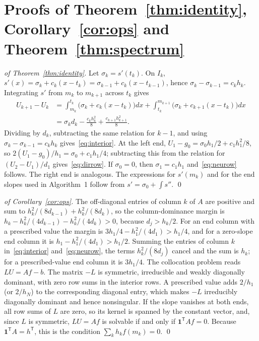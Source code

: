 
\appendix
\section{Proofs of Theorem~\ref{thm:identity}, Corollary~\ref{cor:ops} and Theorem~\ref{thm:spectrum}}\label{app:proofs}
\begin{proof}[of Theorem~\ref{thm:identity}]
Let $\sigma_k=s'(t_k)$. On $I_k$, $s'(x)=\sigma_k+c_k(x-t_k)=\sigma_{k-1}+c_k(x-t_{k-1})$, hence
$\sigma_k-\sigma_{k-1}=c_kh_k$. Integrating $s'$ from $m_k$ to $m_{k+1}$ across $t_k$ gives
\begin{align*}
U_{k+1}-U_k&=\int_{m_k}^{t_k}\!\big(\sigma_k+c_k(x-t_k)\big)dx+\int_{t_k}^{m_{k+1}}\!\big(\sigma_k+c_{k+1}(x-t_k)\big)dx\\
&=\sigma_kd_k-\frac{c_kh_k^2}{8}+\frac{c_{k+1}h_{k+1}^2}{8}.
\end{align*}
Dividing by $d_k$, subtracting the same relation for $k-1$, and using $\sigma_k-\sigma_{k-1}=c_kh_k$
gives~\eqref{eq:interior}. At the left end, $U_1-g_0=\sigma_0h_1/2+c_1h_1^2/8$, so
$2(U_1-g_0)/h_1=\sigma_0+c_1h_1/4$; subtracting this from the relation for $(U_2-U_1)/d_1$
gives~\eqref{eq:dirrow}. If $\sigma_0=0$, then $\sigma_1=c_1h_1$ and~\eqref{eq:neurow} follows. The right
end is analogous. The expressions for $s'(m_k)$ and for the end slopes used in Algorithm~1 follow from
$s'=\sigma_0+\int s''$. \qed
\end{proof}

\begin{proof}[of Corollary~\ref{cor:ops}]
The off-diagonal entries of column $k$ of $A$ are positive and sum to $h_k^2/(8d_{k-1})+h_k^2/(8d_k)$, so
the column-dominance margin is $h_k-h_k^2/(4d_{k-1})-h_k^2/(4d_k)>0$, because $d_j>h_k/2$. For an end column
with a prescribed value the margin is $3h_1/4-h_1^2/(4d_1)>h_1/4$, and for a zero-slope end column it is
$h_1-h_1^2/(4d_1)>h_1/2$. Summing the entries of column $k$ in~\eqref{eq:interior} and~\eqref{eq:neurow}, the
terms $h_k^2/(8d_j)$ cancel and the sum is $h_k$; for a prescribed-value end column it is $3h_1/4$. The
collocation problem reads $LU=Af-b$. The matrix $-L$ is symmetric, irreducible and weakly diagonally
dominant, with zero row sums in the interior rows. A prescribed value adds $2/h_1$ (or $2/h_N$) to the
corresponding diagonal entry, which makes $-L$ irreducibly diagonally dominant and hence nonsingular. If
the slope vanishes at both ends, all row sums of $L$ are zero, so its kernel is spanned by the constant
vector, and, since $L$ is symmetric, $LU=Af$ is solvable if and only if $\mathbf 1^{\mathsf T}Af=0$. Because
$\mathbf 1^{\mathsf T}A=h^{\mathsf T}$, this is the condition $\sum_kh_kf(m_k)=0$. \qed
\end{proof}

